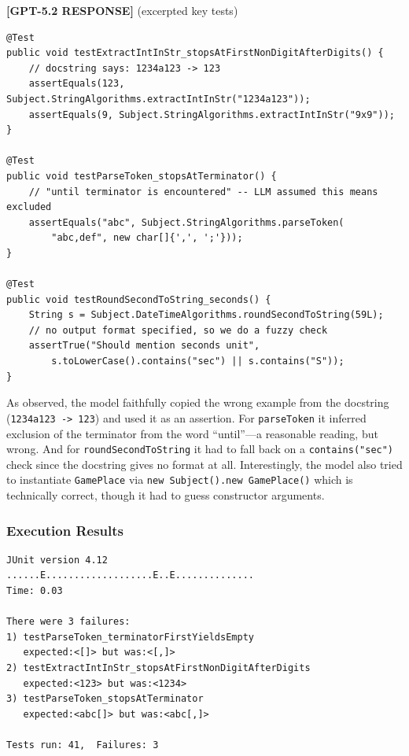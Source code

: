 \documentclass[acmsmall,nonacm]{acmart}
\begin{document}
\bigskip

\begin{responsebox}
\textbf{[GPT-5.2 RESPONSE]} (excerpted key tests)

\begin{verbatim}
@Test
public void testExtractIntInStr_stopsAtFirstNonDigitAfterDigits() {
    // docstring says: 1234a123 -> 123
    assertEquals(123, Subject.StringAlgorithms.extractIntInStr("1234a123"));
    assertEquals(9, Subject.StringAlgorithms.extractIntInStr("9x9"));
}

@Test
public void testParseToken_stopsAtTerminator() {
    // "until terminator is encountered" -- LLM assumed this means excluded
    assertEquals("abc", Subject.StringAlgorithms.parseToken(
        "abc,def", new char[]{',', ';'}));
}

@Test
public void testRoundSecondToString_seconds() {
    String s = Subject.DateTimeAlgorithms.roundSecondToString(59L);
    // no output format specified, so we do a fuzzy check
    assertTrue("Should mention seconds unit",
        s.toLowerCase().contains("sec") || s.contains("S"));
}
\end{verbatim}
\end{responsebox}

\medskip

As observed, the model faithfully copied
the wrong example from the docstring (\texttt{1234a123 -> 123}) and used it as an assertion.
For \texttt{parseToken} it inferred exclusion of the terminator from the word ``until''---a
reasonable reading, but wrong. And for \texttt{roundSecondToString} it had to fall back on a
\texttt{contains("sec")} check since the docstring gives no format at all. Interestingly, the model
also tried to instantiate \texttt{GamePlace} via \texttt{new Subject().new GamePlace()} which is
technically correct, though it had to guess constructor arguments.

\subsubsection*{Execution Results}

\begin{lstlisting}[style=shell, caption={Test execution output for LLMSimpleTest}]
JUnit version 4.12
......E...................E..E..............
Time: 0.03

There were 3 failures:
1) testParseToken_terminatorFirstYieldsEmpty
   expected:<[]> but was:<[,]>
2) testExtractIntInStr_stopsAtFirstNonDigitAfterDigits
   expected:<123> but was:<1234>
3) testParseToken_stopsAtTerminator
   expected:<abc[]> but was:<abc[,]>

Tests run: 41,  Failures: 3
\end{lstlisting}
\end{document}
